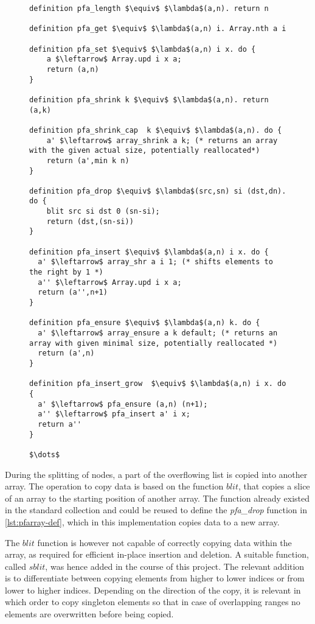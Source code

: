 \begin{figure}
\begin{lstlisting}[mathescape=true, language=Isabelle,label={lst:pfarray-def},
    caption={Important Partially Filled Array functions for Insertion.}]
definition pfa_length $\equiv$ $\lambda$(a,n). return n

definition pfa_get $\equiv$ $\lambda$(a,n) i. Array.nth a i

definition pfa_set $\equiv$ $\lambda$(a,n) i x. do {
    a $\leftarrow$ Array.upd i x a;
    return (a,n)
}

definition pfa_shrink k $\equiv$ $\lambda$(a,n). return (a,k)

definition pfa_shrink_cap  k $\equiv$ $\lambda$(a,n). do {
    a' $\leftarrow$ array_shrink a k; (* returns an array with the given actual size, potentially reallocated*)
    return (a',min k n)
}

definition pfa_drop $\equiv$ $\lambda$(src,sn) si (dst,dn). do {
    blit src si dst 0 (sn-si);
    return (dst,(sn-si))
}

definition pfa_insert $\equiv$ $\lambda$(a,n) i x. do {
  a' $\leftarrow$ array_shr a i 1; (* shifts elements to the right by 1 *)
  a'' $\leftarrow$ Array.upd i x a;
  return (a'',n+1)
}

definition pfa_ensure $\equiv$ $\lambda$(a,n) k. do {
  a' $\leftarrow$ array_ensure a k default; (* returns an array with given minimal size, potentially reallocated *)
  return (a',n)
}

definition pfa_insert_grow  $\equiv$ $\lambda$(a,n) i x. do {
  a' $\leftarrow$ pfa_ensure (a,n) (n+1);
  a'' $\leftarrow$ pfa_insert a' i x;
  return a''
}

$\dots$
\end{lstlisting}
\end{figure}


During the splitting of nodes, a part of the overflowing
list is copied into another array.
The operation to copy data is based on the function $blit$,
that copies a slice of an array to the starting position of another array.
The function already existed in the standard collection and could be reused
to define the \textit{pfa\_drop} function in \autoref{lst:pfarray-def}, which in this implementation copies data to a new array.

The $blit$ function is however not capable of correctly copying data
within the array, as required for efficient in-place insertion and deletion.
A suitable function, called $sblit$, was hence added in the course of this project.
The relevant addition is to differentiate between copying elements
from higher to lower indices or from lower to higher indices.
Depending on the direction of the copy, it is relevant
in which order to copy singleton elements so that in case
of overlapping ranges no elements are overwritten before being copied.

